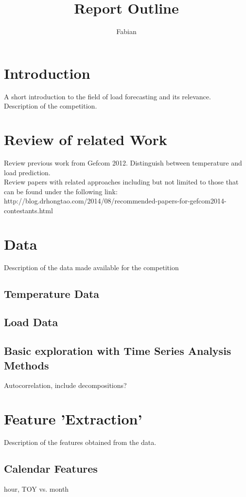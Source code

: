 \documentclass{article}
\begin{document}
\title{Report Outline}
\author{Fabian}

\maketitle

\section{Introduction}
A short introduction to the field of load forecasting and its relevance.\\
Description of the competition.

\section{Review of related Work}
Review previous work from Gefcom 2012. Distinguish between temperature and load prediction.\\
Review papers with related approaches including but not limited to those that can be found under the following link: http://blog.drhongtao.com/2014/08/recommended-papers-for-gefcom2014-contestants.html

\section{Data}
Description of the data made available for the competition
\subsection{Temperature Data}
\subsection{Load Data}
\subsection{Basic exploration with Time Series Analysis Methods}
Autocorrelation, include decompositions?

\section{Feature 'Extraction'}
Description of the features obtained from the data. 
\subsection{Calendar Features}
hour, TOY vs. month
\end{document}
